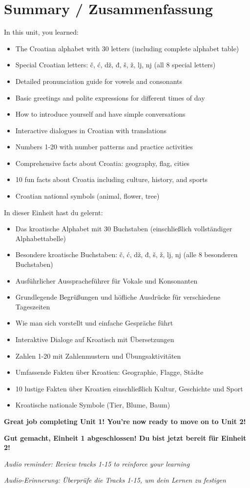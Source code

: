 \section{Summary / Zusammenfassung}

In this unit, you learned:
\begin{itemize}
    \item The Croatian alphabet with 30 letters (including complete alphabet table)
    \item Special Croatian letters: č, ć, dž, đ, š, ž, lj, nj (all 8 special letters)
    \item Detailed pronunciation guide for vowels and consonants
    \item Basic greetings and polite expressions for different times of day
    \item How to introduce yourself and have simple conversations
    \item Interactive dialogues in Croatian with translations
    \item Numbers 1-20 with number patterns and practice activities
    \item Comprehensive facts about Croatia: geography, flag, cities
    \item 10 fun facts about Croatia including culture, history, and sports
    \item Croatian national symbols (animal, flower, tree)
\end{itemize}

In dieser Einheit hast du gelernt:
\begin{itemize}
    \item Das kroatische Alphabet mit 30 Buchstaben (einschließlich vollständiger Alphabettabelle)
    \item Besondere kroatische Buchstaben: č, ć, dž, đ, š, ž, lj, nj (alle 8 besonderen Buchstaben)
    \item Ausführlicher Ausspracheführer für Vokale und Konsonanten
    \item Grundlegende Begrüßungen und höfliche Ausdrücke für verschiedene Tageszeiten
    \item Wie man sich vorstellt und einfache Gespräche führt
    \item Interaktive Dialoge auf Kroatisch mit Übersetzungen
    \item Zahlen 1-20 mit Zahlenmustern und Übungsaktivitäten
    \item Umfassende Fakten über Kroatien: Geographie, Flagge, Städte
    \item 10 lustige Fakten über Kroatien einschließlich Kultur, Geschichte und Sport
    \item Kroatische nationale Symbole (Tier, Blume, Baum)
\end{itemize}

\vspace{1cm}

\textbf{Great job completing Unit 1! You're now ready to move on to Unit 2!}

\textbf{Gut gemacht, Einheit 1 abgeschlossen! Du bist jetzt bereit für Einheit 2!}

\textit{Audio reminder: Review tracks 1-15 to reinforce your learning}

\textit{Audio-Erinnerung: Überprüfe die Tracks 1-15, um dein Lernen zu festigen}

